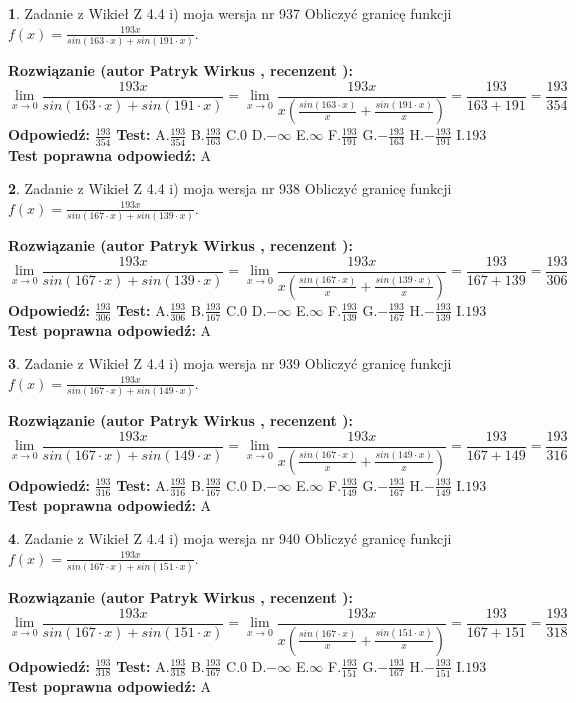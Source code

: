 \documentclass[12pt, a4paper]{article}
\theoremstyle{definition} %
\newtheorem{zad}{}
\newcommand{\zadStart}[1]{\begin{zad}#1\newline}
\newcommand{\zadStop}{\end{zad}}
\newcommand{\rozwStart}[2]{\noindent \textbf{Rozwiązanie (autor #1 , recenzent #2): }\newline}
\newcommand{\rozwStop}{\newline}
\newcommand{\odpStart}{\noindent \textbf{Odpowiedź:}\newline}
\newcommand{\odpStop}{\newline}
\newcommand{\testStart}{\noindent \textbf{Test:}\newline}
\newcommand{\testStop}{\newline}
\newcommand{\kluczStart}{\noindent \textbf{Test poprawna odpowiedź:}\newline}
\newcommand{\kluczStop}{\newline}
\begin{document}
\zadStart{Zadanie z Wikieł Z 4.4 i) moja wersja nr 937}
Obliczyć granicę funkcji $f(x)=\frac{193x}{sin(163\cdot x) +sin(191\cdot x)}$.
\zadStop
\rozwStart{Patryk Wirkus}{}
$$\lim\limits_{x\to 0}\frac{193x}{sin(163\cdot x) +sin(191\cdot x)}=\lim\limits_{x\to 0}\frac{193x}{x(\frac{sin(163\cdot x)}{x}+\frac{sin(191\cdot x)}{x})}=\frac{193}{163+191} = \frac{193}{354}$$
\rozwStop
\odpStart
$\frac{193}{354}$
\odpStop
\testStart
A.$\frac{193}{354}$
B.$\frac{193}{163}$
C.$0$
D.$-\infty$
E.$\infty$
F.$\frac{193}{191}$
G.$-\frac{193}{163}$
H.$-\frac{193}{191}$
I.$193$
\testStop
\kluczStart
A
\kluczStop



\zadStart{Zadanie z Wikieł Z 4.4 i) moja wersja nr 938}
Obliczyć granicę funkcji $f(x)=\frac{193x}{sin(167\cdot x) +sin(139\cdot x)}$.
\zadStop
\rozwStart{Patryk Wirkus}{}
$$\lim\limits_{x\to 0}\frac{193x}{sin(167\cdot x) +sin(139\cdot x)}=\lim\limits_{x\to 0}\frac{193x}{x(\frac{sin(167\cdot x)}{x}+\frac{sin(139\cdot x)}{x})}=\frac{193}{167+139} = \frac{193}{306}$$
\rozwStop
\odpStart
$\frac{193}{306}$
\odpStop
\testStart
A.$\frac{193}{306}$
B.$\frac{193}{167}$
C.$0$
D.$-\infty$
E.$\infty$
F.$\frac{193}{139}$
G.$-\frac{193}{167}$
H.$-\frac{193}{139}$
I.$193$
\testStop
\kluczStart
A
\kluczStop



\zadStart{Zadanie z Wikieł Z 4.4 i) moja wersja nr 939}
Obliczyć granicę funkcji $f(x)=\frac{193x}{sin(167\cdot x) +sin(149\cdot x)}$.
\zadStop
\rozwStart{Patryk Wirkus}{}
$$\lim\limits_{x\to 0}\frac{193x}{sin(167\cdot x) +sin(149\cdot x)}=\lim\limits_{x\to 0}\frac{193x}{x(\frac{sin(167\cdot x)}{x}+\frac{sin(149\cdot x)}{x})}=\frac{193}{167+149} = \frac{193}{316}$$
\rozwStop
\odpStart
$\frac{193}{316}$
\odpStop
\testStart
A.$\frac{193}{316}$
B.$\frac{193}{167}$
C.$0$
D.$-\infty$
E.$\infty$
F.$\frac{193}{149}$
G.$-\frac{193}{167}$
H.$-\frac{193}{149}$
I.$193$
\testStop
\kluczStart
A
\kluczStop



\zadStart{Zadanie z Wikieł Z 4.4 i) moja wersja nr 940}
Obliczyć granicę funkcji $f(x)=\frac{193x}{sin(167\cdot x) +sin(151\cdot x)}$.
\zadStop
\rozwStart{Patryk Wirkus}{}
$$\lim\limits_{x\to 0}\frac{193x}{sin(167\cdot x) +sin(151\cdot x)}=\lim\limits_{x\to 0}\frac{193x}{x(\frac{sin(167\cdot x)}{x}+\frac{sin(151\cdot x)}{x})}=\frac{193}{167+151} = \frac{193}{318}$$
\rozwStop
\odpStart
$\frac{193}{318}$
\odpStop
\testStart
A.$\frac{193}{318}$
B.$\frac{193}{167}$
C.$0$
D.$-\infty$
E.$\infty$
F.$\frac{193}{151}$
G.$-\frac{193}{167}$
H.$-\frac{193}{151}$
I.$193$
\testStop
\kluczStart
A
\kluczStop
\end{document}
